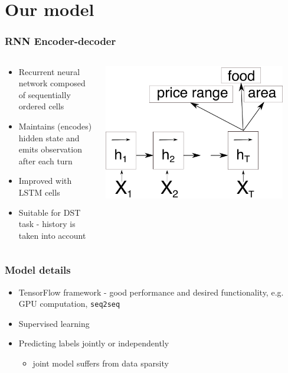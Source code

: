 \section{Our model}
\begin{frame}
\frametitle{RNN Encoder-decoder}
\begin{columns}
\begin{column}{0.65\textwidth}
\begin{itemize}
\item Recurrent neural network composed of sequentially ordered cells
\item Maintains (encodes) hidden state and emits observation after each turn
\item Improved with LSTM cells
\item Suitable for DST task - history is taken into account
\end{itemize}
\end{column}
\begin{column}{0.35\textwidth}
\includegraphics[width=0.90\textwidth]{encoder.pdf}
\end{column}
\end{columns}
\end{frame}

\begin{frame}
\frametitle{Model details}
\begin{itemize}
\item TensorFlow framework - good performance and desired functionality, e.g. GPU computation, \texttt{seq2seq}
\item Supervised learning
\item Predicting labels jointly or independently
\begin{itemize}
\item joint model suffers from data sparsity\
\end{itemize}
\end{itemize}
\end{frame}

